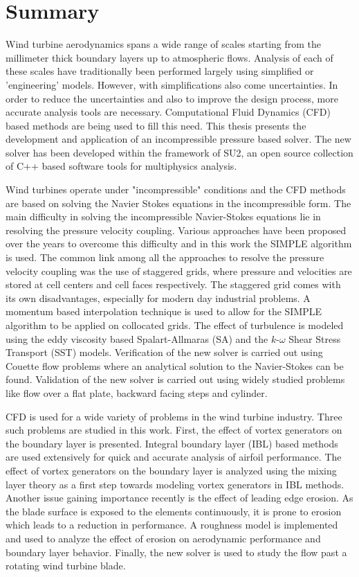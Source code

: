 \chapter*{Summary}

Wind turbine aerodynamics spans a wide range of scales starting from the millimeter thick boundary layers up to atmospheric flows. Analysis of each of these scales have traditionally been performed largely using simplified or 'engineering' models. However, with simplifications also come uncertainties. In order to reduce the uncertainties and also to improve the design process, more accurate analysis tools are necessary. Computational Fluid Dynamics (CFD) based methods are being used to fill this need. This thesis presents the development and application of an incompressible pressure based solver. The new solver has been developed within the framework of SU2, an open source collection of C++ based software tools for multiphysics analysis. 

Wind turbines operate under "incompressible" conditions and the CFD methods are based on solving the Navier Stokes equations in the incompressible form. The main difficulty in solving the incompressible Navier-Stokes equations lie in resolving the pressure velocity coupling. Various approaches have been proposed over the years to overcome this difficulty and in this work the SIMPLE algorithm is used. The common link among all the approaches to resolve the pressure velocity coupling was the use of staggered grids, where pressure and velocities are stored at cell centers and cell faces respectively. The staggered grid comes with its own disadvantages, especially for modern day industrial problems. A momentum based interpolation technique is used to allow for the SIMPLE algorithm to be applied on collocated grids. The effect of turbulence is modeled using the eddy viscosity based Spalart-Allmaras (SA) and the $k$-$\omega$ Shear Stress Transport (SST) models. Verification of the new solver is carried out using Couette flow problems where an analytical solution to the Navier-Stokes can be found. Validation of the new solver is carried out using widely studied problems like flow over a flat plate, backward facing steps and cylinder. 

CFD is used for a wide variety of problems in the wind turbine industry. Three such problems are studied in this work. First, the effect of vortex generators on the boundary layer is presented. Integral boundary layer (IBL) based methods are used extensively for quick and accurate analysis of airfoil performance. The effect of vortex generators on the boundary layer is analyzed using the mixing layer theory as a first step towards modeling vortex generators in IBL methods. Another issue gaining importance recently is the effect of leading edge erosion. As the blade surface is exposed to the elements continuously, it is prone to erosion which leads to a reduction in performance. A roughness model is implemented and used to analyze the effect of erosion on aerodynamic performance and boundary layer behavior. Finally, the new solver is used to study the flow past a rotating wind turbine blade.

